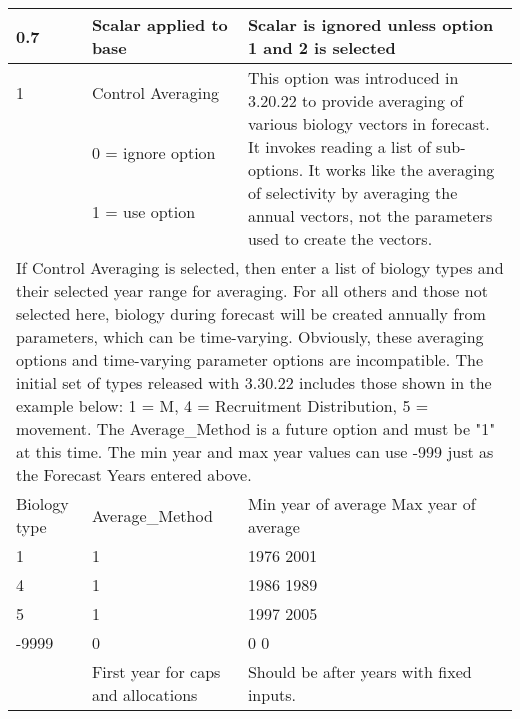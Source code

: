 \begin{landscape}
{\begin{longtable}{p{3.2cm} p{7cm} p{10.8cm}}
 \hline
 0.7 \Tstrut & Scalar applied to base & \multirow{1}{1cm}[-0.05cm]{\parbox{11cm}{Scalar is ignored unless option 1 and 2 is selected}} \Bstrut\\
 
 \hline
 1 & Control Averaging & \multirow{4}{1cm}{\parbox{11cm}{This option was introduced in 3.20.22 to provide averaging of various biology vectors in forecast. It invokes reading a list of sub-options. It works like the averaging of selectivity by averaging the annual vectors, not the parameters used to create the vectors.}} \Tstrut\\
   & 0 = ignore option & \\
   & 1 = use option & \\
   & & \\ 

 \hline
 \multicolumn{3}{l}{\multirow{5}{1cm}{\parbox{22cm}{If Control Averaging is selected, then enter a list of biology types and their selected year range for averaging.  For all others and those not selected here, biology during forecast will be created annually from parameters, which can be time-varying. Obviously, these averaging options and time-varying parameter options are incompatible. The initial set of types released with 3.30.22 includes those shown in the example below: 1 = M, 4 = Recruitment Distribution, 5 = movement. The Average\_Method is a future option and must be "1" at this time. The min year and max year values can use -999 just as the Forecast Years entered above.}}} \\
 & & \\
 & & \\
 & & \\ 
 & & \\

 \hline
 Biology type & Average\_Method & Min year of average \hspace{6mm} Max year of average \Tstrut\\
 1 & 1 & 1976 \hspace{30mm} 2001 \\
 4 & 1 & 1986 \hspace{30mm} 1989 \\
 5 & 1 & 1997 \hspace{30mm} 2005 \\
 -9999 & 0 & 0 \hspace{36mm} 0 \Bstrut\\

 \pagebreak
 2015 \Tstrut & First year for caps and allocations & \multirow{1}{1cm}[-0.10cm]{\parbox{11cm}{Should be after years with fixed inputs.}} \Bstrut\\


\end{longtable}}
\end{landscape}
